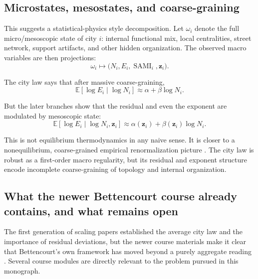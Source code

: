 \documentclass[11pt]{article}
\newcommand{\SAMI}{\operatorname{SAMI}}
\newcommand{\E}{\mathbb{E}}
\begin{document}
\subsection{Microstates, mesostates, and coarse-graining}

This suggests a statistical-physics style decomposition. Let \(\omega_i\) denote the full micro/mesoscopic state of city \(i\): internal functional mix, local centralities, street network, support artifacts, and other hidden organization. The observed macro variables are then projections:
\begin{equation}
\omega_i \mapsto \bigl(N_i,E_i,\SAMI_i,\mathbf{z}_i\bigr).
\end{equation}

The city law says that after massive coarse-graining,
\begin{equation}
\E[\log E_i \mid \log N_i] \approx \alpha + \beta \log N_i.
\end{equation}

But the later branches show that the residual and even the exponent are modulated by mesoscopic state:
\begin{equation}
\E[\log E_i \mid \log N_i,\mathbf{z}_i]
\approx
\alpha(\mathbf{z}_i) + \beta(\mathbf{z}_i)\log N_i.
\end{equation}

This is not equilibrium thermodynamics in any naive sense. It is closer to a nonequilibrium, coarse-grained empirical renormalization picture \citep{wilson1971renormalization,sethna2006statistical}. The city law is robust as a first-order macro regularity, but its residual and exponent structure encode incomplete coarse-graining of topology and internal organization.

\subsection{What the newer Bettencourt course already contains, and what remains open}

The first generation of scaling papers established the average city law and the importance of residual deviations, but the newer course materials make it clear that Bettencourt's own framework has moved beyond a purely aggregate reading \citep{bettencourtcourse2024}. Several course modules are directly relevant to the problem pursued in this monograph.
\end{document}
